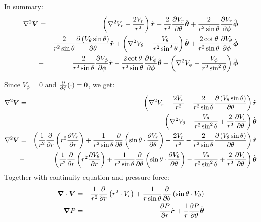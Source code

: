 In summary:
\begin{eqnarray}
\nabla^2 \boldsymbol{V} &=& \left(\nabla^2 V_r - \frac{2V_r}{r^2}\right)\hat{\boldsymbol{r}}
+ \frac{2}{r^2}\frac{\partial V_r}{\partial \theta} \hat{\boldsymbol{\theta}} + \frac{2}{r^2 \sin\theta}\frac{\partial V_r}{\partial \phi} \hat{\boldsymbol{\phi}} \\
&-&
\frac{2}{r^2 \sin\theta} \frac{\partial \left(V_\theta \sin\theta \right)}{\partial \theta}\hat{\boldsymbol{r}}
+ \left(\nabla^2 V_\theta - \frac{V_\theta}{r^2 \sin^2\theta}\right) \hat{\boldsymbol{\theta}}
+ \frac{2 \cot\theta}{r^2 \sin\theta} \frac{\partial V_\theta}{\partial \phi} \hat{\boldsymbol{\phi}} \\
&-&
\frac{2}{r^2 \sin\theta}\frac{\partial V_\phi}{\partial \phi}\hat{\boldsymbol{r}} -
\frac{2 \cot\theta}{r^2 \sin\theta}\frac{\partial V_\phi}{\partial \phi}\hat{\boldsymbol{\theta}}
+ \left(\nabla^2 V_\phi - \frac{V_\phi}{r^2 \sin^2\theta}\right)\hat{\boldsymbol{\phi}}
\end{eqnarray}

Since $V_\phi = 0$ and $\frac{\partial }{\partial \phi}(\cdot) = 0$, we get:
\begin{eqnarray}
\nabla^2 \boldsymbol{V} &=& \left(\nabla^2 V_r - \frac{2V_r}{r^2} - \frac{2}{r^2 \sin\theta} \frac{\partial \left(V_\theta \sin\theta \right)}{\partial \theta}\right)\hat{\boldsymbol{r}}
\\
&+&
\left(\nabla^2 V_\theta - \frac{V_\theta}{r^2 \sin^2\theta} + \frac{2}{r^2}\frac{\partial V_r}{\partial \theta}\right) \hat{\boldsymbol{\theta}}
\\
\nabla^2 \boldsymbol{V} &=& \left(
\frac{1}{r^2}\frac{\partial }{\partial r}\left( r^2 \frac{\partial V_r}{\partial r} \right) + \frac{1}{r^2 \sin\theta} \frac{\partial }{\partial \theta} \left( \sin\theta \cdot \frac{\partial V_r}{\partial \theta}\right)
 - \frac{2V_r}{r^2} - \frac{2}{r^2 \sin\theta} \frac{\partial \left(V_\theta \sin\theta \right)}{\partial \theta}\right)\hat{\boldsymbol{r}} \\
&+& \left(
\frac{1}{r^2}\frac{\partial }{\partial r}\left( r^2 \frac{\partial V_\theta}{\partial r} \right) + \frac{1}{r^2 \sin\theta} \frac{\partial }{\partial \theta} \left( \sin\theta \cdot \frac{\partial V_\theta}{\partial \theta}\right)
 - \frac{V_\theta}{r^2 \sin^2\theta} + \frac{2}{r^2}\frac{\partial V_r}{\partial \theta}\right) \hat{\boldsymbol{\theta}}
\end{eqnarray}
Together with continuity equation and pressure force:
\begin{eqnarray}
\boldsymbol{\nabla} \cdot \boldsymbol{V} &=& \frac{1}{r^2}\frac{\partial}{\partial r} \left( r^2 \cdot V_r\right)
  + \frac{1}{r \sin\theta} \frac{\partial}{\partial \theta} \left( \sin\theta \cdot V_\theta\right)
\\
\boldsymbol{\nabla} P &=& \frac{\partial P}{\partial r} \hat{\boldsymbol{r}} + \frac{1}{r}\frac{\partial P}{\partial \theta} \hat{\boldsymbol{\theta}}
\end{eqnarray}
